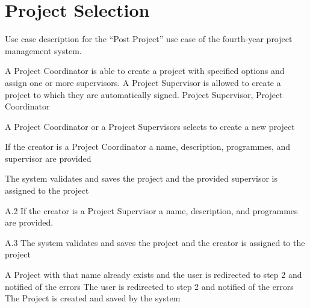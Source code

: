 \documentclass[document.tex]{subfiles}
\begin{document}
\FloatBarrier


\section {Project Selection}
\label {sec:detailed-use-cases-1-management}


\begin{table}[!htbp]
  \centering
  \caption{Use case description for the ``Post Project'' use case of the fourth-year project management system.}
  \label{tbl:use-case-create-project}

  \begin{usecase}
    A Project Coordinator is able to create a project with specified options and assign one or more supervisors. A Project Supervisor is allowed to create a project to which they are automatically signed.
    Project Supervisor, Project Coordinator
    \ucnormal
    \begin{ucenum}
      \item A Project Coordinator or a Project Supervisors selects to create a new project
      \item If the creator is a Project Coordinator a name, description, programmes, and supervisor are provided
      \item The system validates and saves the project and the provided supervisor is assigned to the project
    \end{ucenum}
    \begin{ucenum}
      \item [A.2] If the creator is a Project Supervisor a name, description, and programmes are provided.
      \item [A.3] The system validates and saves the project and the creator is assigned to the project
    \end{ucenum}
    A Project with that name already exists and the user is redirected to step 2 and notified of the errors
    The user is redirected to step 2 and notified of the errors
    The Project is created and saved by the system
  \end{usecase}
\end{table}
\end{document}
